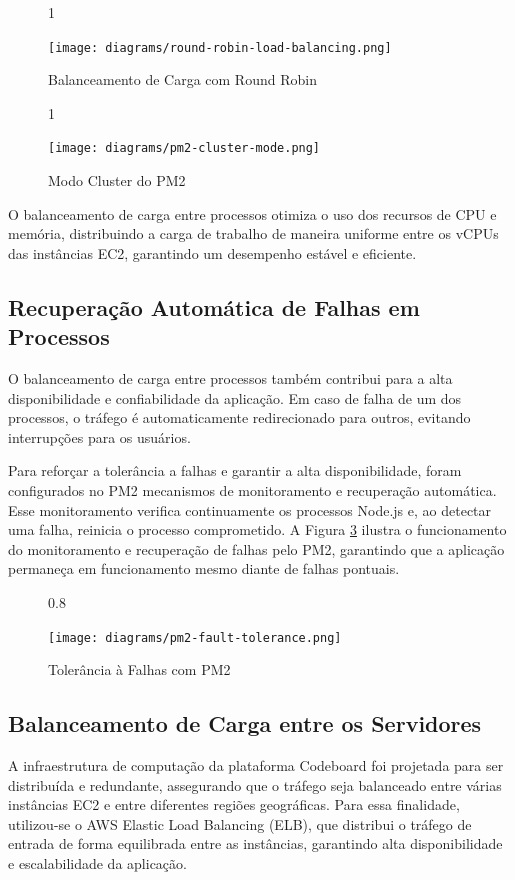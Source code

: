 \begin{figure}[H]{1\textwidth}
    \centering
    \caption{Balanceamento de Carga com Round Robin}
    \label{fig:round-robin-load-balancing}
    \texttt{[image: diagrams/round-robin-load-balancing.png]}
\end{figure} 

\begin{figure}[H]{1\textwidth}
    \centering
    \caption{Modo Cluster do PM2}
    \label{fig:pm2-cluster-mode}
    \texttt{[image: diagrams/pm2-cluster-mode.png]}
\end{figure}

O balanceamento de carga entre processos otimiza o uso dos recursos de CPU e memória, distribuindo a carga de trabalho de maneira uniforme entre os vCPUs das instâncias EC2, garantindo um desempenho estável e eficiente.

\subsection{Recuperação Automática de Falhas em Processos}

O balanceamento de carga entre processos também contribui para a alta disponibilidade e confiabilidade da aplicação. Em caso de falha de um dos processos, o tráfego é automaticamente redirecionado para outros, evitando interrupções para os usuários.

Para reforçar a tolerância a falhas e garantir a alta disponibilidade, foram configurados no PM2 mecanismos de monitoramento e recuperação automática. Esse monitoramento verifica continuamente os processos Node.js e, ao detectar uma falha, reinicia o processo comprometido. A Figura \ref{fig:pm2-fault-tolerance} ilustra o funcionamento do monitoramento e recuperação de falhas pelo PM2, garantindo que a aplicação permaneça em funcionamento mesmo diante de falhas pontuais.


\begin{figure}[H]{0.8\textwidth}
    \centering
    \caption{Tolerância à Falhas com PM2}
    \label{fig:pm2-fault-tolerance}
    \texttt{[image: diagrams/pm2-fault-tolerance.png]}
\end{figure}


\subsection{Balanceamento de Carga entre os Servidores}

A infraestrutura de computação da plataforma Codeboard foi projetada para ser distribuída e redundante, assegurando que o tráfego seja balanceado entre várias instâncias EC2 e entre diferentes regiões geográficas. Para essa finalidade, utilizou-se o AWS Elastic Load Balancing (ELB), que distribui o tráfego de entrada de forma equilibrada entre as instâncias, garantindo alta disponibilidade e escalabilidade da aplicação.

